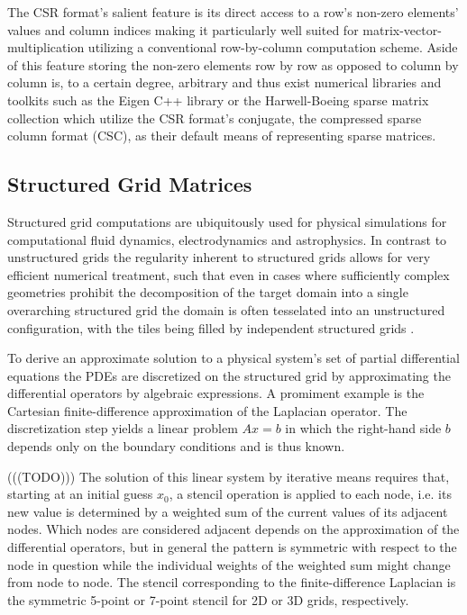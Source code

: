 \documentclass{article}
\begin{document}
    The CSR format's salient feature is its direct access to a row's non-zero elements' values and column indices making
    it particularly well suited for matrix-vector-multiplication utilizing a conventional row-by-column computation
    scheme. Aside of this feature storing the non-zero elements row by row as opposed to column by column is, to a
    certain degree, arbitrary and thus exist numerical libraries and toolkits such as the Eigen C++ library
    \cite{eigen:website} or the Harwell-Boeing sparse matrix collection \cite{harwell-boeing} which utilize the CSR
    format's conjugate, the compressed sparse column format (CSC), as their default means of representing sparse
    matrices.

  \subsection{Structured Grid Matrices}

    Structured grid computations are ubiquitously used for physical simulations for computational fluid dynamics,
    electrodynamics and astrophysics.  In contrast to unstructured grids the regularity inherent to structured grids
    allows for very efficient numerical treatment, such that even in cases where sufficiently complex geometries
    prohibit the decomposition of the target domain into a single overarching structured grid the domain is often
    tesselated into an unstructured configuration, with the tiles being filled by independent structured grids
    \cite{Badcock2000}.

    To derive an approximate solution to a physical system's set of partial differential equations
    the PDEs are discretized on the structured grid by approximating the differential operators by algebraic
    expressions. A promiment example is the Cartesian finite-difference approximation of the Laplacian operator.
    The discretization step yields a linear problem $A x = b$ in which the right-hand side $b$ depends only on the
    boundary conditions and is thus known.

    (((TODO))) The solution of this linear system by iterative means requires that, starting at an initial guess $x_0$,
    a stencil operation is applied to each node, i.e. its new value is determined by a weighted sum of the current
    values of its adjacent nodes. Which nodes are considered adjacent depends on the approximation of the differential
    operators, but in general the pattern is symmetric with respect to the node in question while the individual weights
    of the weighted sum might change from node to node. The stencil corresponding to the finite-difference Laplacian is
    the symmetric 5-point or 7-point stencil for 2D or 3D grids, respectively.
\end{document}
